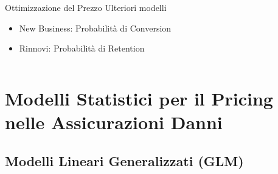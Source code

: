 \documentclass[pdf, aspectratio=169]{beamer}\usepackage[]{graphicx}\usepackage[]{color}
\theoremstyle{definition}
\begin{document}
\begin{frame}
\begin{columns}[T]
\begin{column}{0.5\linewidth}
{\begin{block}{Ottimizzazione del Prezzo}
      Ulteriori modelli
      \begin{itemize}
        \item New Business: Probabilità di Conversion
        \item Rinnovi: Probabilità di Retention
      \end{itemize}

    \end{block}
  }
\end{column}

\end{columns}

\end{frame}





\section{Modelli Statistici per il Pricing nelle Assicurazioni Danni}

\subsection{Modelli Lineari Generalizzati (GLM)}
\end{document}
